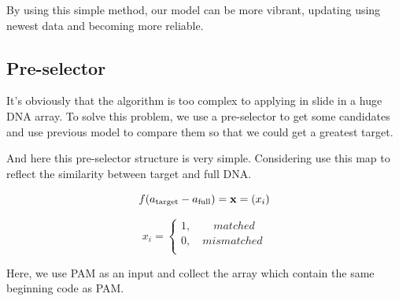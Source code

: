 By using this simple method, our model can be more vibrant, updating using newest data and becoming more reliable.

\subsection{Pre-selector}
It’s obviously that the algorithm is too complex to applying in slide in a huge DNA array. To solve this problem, we use a pre-selector to get some candidates and use previous model to compare them so that we could get a greatest target.\par
And here this pre-selector structure is very simple.
Considering use this map to reflect the similarity between target and full DNA.

\begin{equation}
f({a_{{\rm{target}}}} - {a_{{\rm{full}}}}) = {\bf{x}} = ({x_i})
\end{equation}

\begin{equation}{x_i} = \left\{ {\begin{array}{*{20}{c}}
{1,\quad \quad matched}  \\
{0,\quad mismatched}  \\
\end{array}} \right.
\end{equation}

Here, we use PAM as an input and collect the array which contain the same beginning code as PAM.

